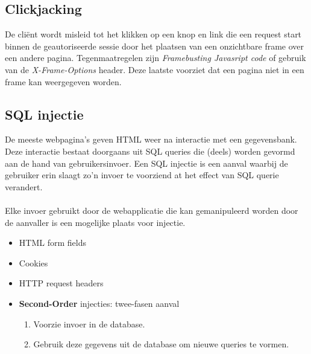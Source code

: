 \documentclass[../main.tex]{subfiles}
\begin{document}
\subsection{Clickjacking}
De cli\"ent wordt misleid tot het klikken op een knop en link die een request start binnen de geautoriseerde sessie door het plaatsen van een onzichtbare frame over een andere pagina. Tegenmaatregelen zijn \textit{Framebusting Javasript code} of gebruik van de \textit{X-Frame-Options} header. Deze laatste voorziet dat een pagina niet in een frame kan weergegeven worden.

\subsection{SQL injectie}
De meeste webpagina's geven HTML weer na interactie met een gegevensbank. Deze interactie bestaat doorgaans uit SQL queries die (deels) worden gevormd aan de hand van gebruikersinvoer. Een SQL injectie is een aanval waarbij de gebruiker erin slaagt zo'n invoer te voorziend at het effect van SQL querie verandert. 
\\\\
Elke invoer gebruikt door de webapplicatie die kan gemanipuleerd worden door de aanvaller is een mogelijke plaats voor injectie.
\begin{itemize}
	\item HTML form fields
	\item Cookies
	\item HTTP request headers
	\item \textbf{Second-Order} injecties: twee-fasen aanval
	\begin{enumerate}
		\item Voorzie invoer in de database.
		\item Gebruik deze gegevens uit de database om nieuwe queries te vormen.	
	\end{enumerate}
\end{itemize}
\end{document}
